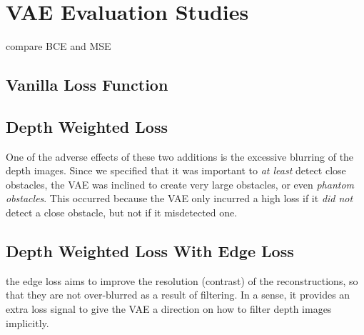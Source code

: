 \chapter{VAE Evaluation Studies}
\label{chap:8_vae_evaluation_studies}
compare BCE and MSE

\section{Vanilla Loss Function}

\section{Depth Weighted Loss}
One of the adverse effects of these two additions is the excessive blurring of the depth images. Since we specified that it was important to \textit{at least} detect close obstacles, the VAE was inclined to create very large obstacles, or even \textit{phantom obstacles}. This occurred because the VAE only incurred a high loss if it \textit{did not} detect a close obstacle, but not if it misdetected one. 

\section{Depth Weighted Loss With Edge Loss}
the edge loss aims to improve the resolution (contrast) of the reconstructions, so that they are not over-blurred as a result of filtering. In a sense, it provides an extra loss signal to give the VAE a direction on how to filter depth images implicitly.
